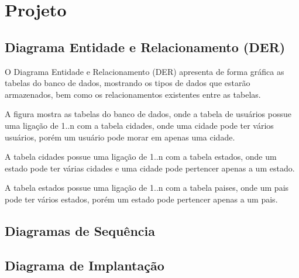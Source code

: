 \chapter{Projeto}

\section{Diagrama Entidade e Relacionamento (DER)}

O Diagrama Entidade e Relacionamento (DER) apresenta de forma gráfica as tabelas do banco de dados, mostrando os tipos de dados que estarão armazenados, bem como os relacionamentos existentes entre as tabelas.

A figura mostra as tabelas do banco de dados, onde a tabela de usuários possue uma ligação de 1..n com a tabela cidades, onde uma cidade pode ter vários usuários, porém um usuário pode morar em apenas uma cidade.

A tabela cidades possue uma ligação de 1..n com a tabela estados, onde um estado pode ter várias cidades e uma cidade pode pertencer apenas a um estado.

A tabela estados possue uma ligação de 1..n com a tabela paises, onde um pais pode ter vários estados, porém um estado pode pertencer apenas a um pais. 



\section{Diagramas de Sequência}

\section{Diagrama de Implantação}